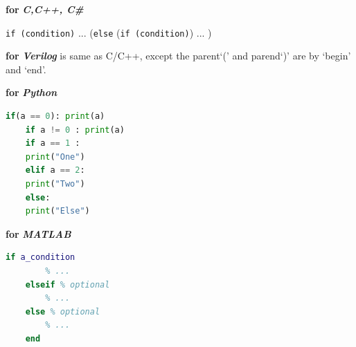 \textbf{for }\textbf{\textit{C,C++, C\#}}



\verb|if (condition)| ... (\verb|else| (\verb|if (condition)|) ... )



\textbf{for }\textbf{\textit{Verilog}} is same as C/C++, except the parent`(' and parend`)' are by `begin' and `end'.



\textbf{for }\textbf{\textit{Python}}

\begin{lstlisting}[language=Python]
	if(a == 0): print(a)
	if a != 0 : print(a)
	if a == 1 :
	print("One")
	elif a == 2:
	print("Two")
	else:
	print("Else")
\end{lstlisting}



\textbf{for }\textbf{\textit{MATLAB}}

\begin{lstlisting}[language=MATLAB]
	if a_condition
		% ...
	elseif % optional
		% ...
	else % optional
		% ...
	end
\end{lstlisting}

